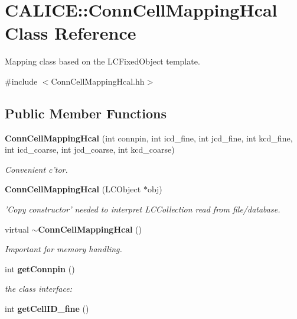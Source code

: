\section{CALICE::ConnCellMappingHcal Class Reference}
\label{classCALICE_1_1ConnCellMappingHcal}


Mapping class based on the LCFixedObject template.  


{\ttfamily \#include $<$ConnCellMappingHcal.hh$>$}\subsection*{Public Member Functions}
\begin{DoxyCompactItemize}
\item 
{\bf ConnCellMappingHcal} (int connpin, int icd\_\-fine, int jcd\_\-fine, int kcd\_\-fine, int icd\_\-coarse, int jcd\_\-coarse, int kcd\_\-coarse)\label{classCALICE_1_1ConnCellMappingHcal_ab42f668b5748b8dfa9b3fc97fa6c7fee}

\begin{DoxyCompactList}\small\item\em Convenient c'tor. \item\end{DoxyCompactList}\item 
{\bf ConnCellMappingHcal} (LCObject $\ast$obj)\label{classCALICE_1_1ConnCellMappingHcal_a081e0f8e841d6f434e17b670cab48d7e}

\begin{DoxyCompactList}\small\item\em 'Copy constructor' needed to interpret LCCollection read from file/database. \item\end{DoxyCompactList}\item 
virtual {\bf $\sim$ConnCellMappingHcal} ()\label{classCALICE_1_1ConnCellMappingHcal_a7a197aeb49859189e104e3d5d94d0391}

\begin{DoxyCompactList}\small\item\em Important for memory handling. \item\end{DoxyCompactList}\item 
int {\bf getConnpin} ()\label{classCALICE_1_1ConnCellMappingHcal_a98cddfbd965baa2a65f830c4b19c9dfc}

\begin{DoxyCompactList}\small\item\em the class interface: \item\end{DoxyCompactList}\item 
int {\bfseries getCellID\_\-fine} ()\label{classCALICE_1_1ConnCellMappingHcal_a86446b579f23ddac044afa98f83be109}


\end{DoxyCompactItemize}
